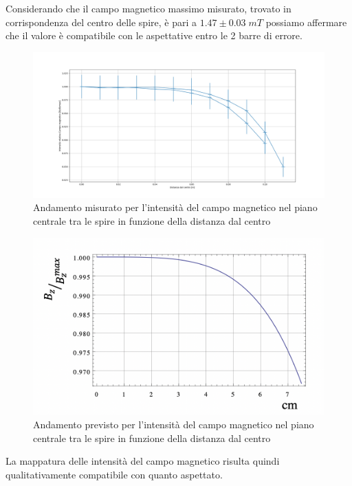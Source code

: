 \documentclass[10pt, a4paper, italian]{article}
\begin{document}
Considerando che il campo magnetico massimo misurato, trovato in corrispondenza del centro delle spire, è pari a $1.47 \pm 0.03 \;mT$ possiamo affermare che il valore è compatibile con le aspettative entro le 2 barre di errore.
\begin{figure}
\includegraphics[width=\textwidth]{sounasegaiochiamalocomecazzotiparetantocifounasegaio}
\caption{Andamento misurato per l'intensità del campo magnetico nel piano centrale tra le spire in funzione della distanza dal centro}
\end{figure}
\begin{figure}
\includegraphics[width=\textwidth]{riferimentoB}
\caption{Andamento previsto per l'intensità del campo magnetico nel piano centrale tra le spire in funzione della distanza dal centro}
\end{figure}
La mappatura delle intensità del campo magnetico risulta quindi qualitativamente compatibile con quanto aspettato.
\end{document}
